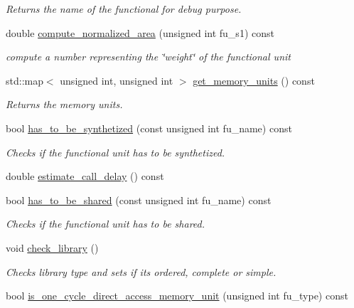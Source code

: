 \begin{DoxyCompactItemize}
\begin{DoxyCompactList}\small\item\em Returns the name of the functional for debug purpose. \end{DoxyCompactList}\item 
double \hyperlink{classAllocationInformation_a5d67bf413b140779cce7e5d1121db521}{compute\+\_\+normalized\+\_\+area} (unsigned int fu\+\_\+s1) const
\begin{DoxyCompactList}\small\item\em compute a number representing the \char`\"{}weight\char`\"{} of the functional unit \end{DoxyCompactList}\item 
std\+::map$<$ unsigned int, unsigned int $>$ \hyperlink{classAllocationInformation_a57e73fc90d331eb1b943123f1bba095e}{get\+\_\+memory\+\_\+units} () const
\begin{DoxyCompactList}\small\item\em Returns the memory units. \end{DoxyCompactList}\item 
bool \hyperlink{classAllocationInformation_a396f27c9f8392246c8e652dd6501f59c}{has\+\_\+to\+\_\+be\+\_\+synthetized} (const unsigned int fu\+\_\+name) const
\begin{DoxyCompactList}\small\item\em Checks if the functional unit has to be synthetized. \end{DoxyCompactList}\item 
double \hyperlink{classAllocationInformation_a8c3a54df4f2c6858cc39399fdad52bcf}{estimate\+\_\+call\+\_\+delay} () const
\item 
bool \hyperlink{classAllocationInformation_a5e6a222a22d684b14f1a2b42eb3b2696}{has\+\_\+to\+\_\+be\+\_\+shared} (const unsigned int fu\+\_\+name) const
\begin{DoxyCompactList}\small\item\em Checks if the functional unit has to be shared. \end{DoxyCompactList}\item 
void \hyperlink{classAllocationInformation_a6ee30c144c13ac6e4582b0568dcfe3ce}{check\+\_\+library} ()
\begin{DoxyCompactList}\small\item\em Checks library type and sets if it\textquotesingle{}s ordered, complete or simple. \end{DoxyCompactList}\item 
bool \hyperlink{classAllocationInformation_a0770d67171506fb5f5c27a3d5c57f174}{is\+\_\+one\+\_\+cycle\+\_\+direct\+\_\+access\+\_\+memory\+\_\+unit} (unsigned int fu\+\_\+type) const

\end{DoxyCompactItemize}
